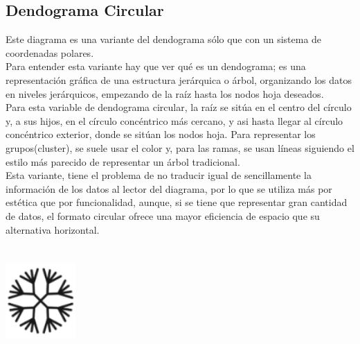 \documentclass{article}\usepackage[]{graphicx}\usepackage[]{color}
\begin{document}
\subsection{Dendograma Circular}
Este diagrama es una variante del dendograma s\'olo que con un sistema de coordenadas polares.~\\
Para entender esta variante hay que ver qu\'e es un dendograma; es una representaci\'on gr\'afica de una estructura jer\'arquica o \'arbol, organizando los datos en niveles jer\'arquicos, empezando de la ra\'iz hasta los nodos hoja deseados.~\\
Para esta variable de dendograma circular, la ra\'iz se sit\'ua en el centro del c\'irculo y, a sus hijos, en el c\'irculo conc\'entrico m\'as cercano, y asi hasta llegar al c\'irculo conc\'entrico exterior, donde se sit\'uan los nodos hoja. Para representar los grupos(cluster), se suele usar el color y, para las ramas, se usan l\'ineas siguiendo el estilo m\'as parecido de representar un \'arbol tradicional.~\\ Esta variante, tiene el problema de no traducir igual de sencillamente la informaci\'on de los datos al lector del diagrama, por lo que se utiliza m\'as por est\'etica que por funcionalidad, aunque, si se tiene que representar gran cantidad de datos, el formato circular ofrece una mayor eficiencia de espacio que su alternativa horizontal.
~\\~\\~\\
\vbox{
    \centering
    \includegraphics[width=0.2\textwidth]{imag/dendo}
}
\end{document}
